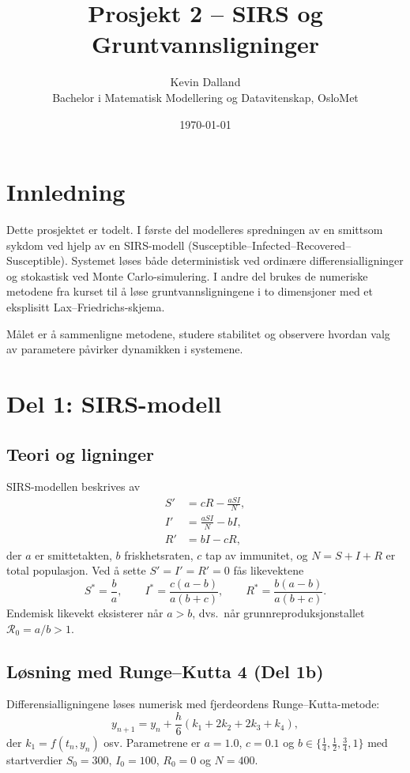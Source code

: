 \documentclass[a4paper,11pt]{article}
\title{Prosjekt 2 -- SIRS og Gruntvannsligninger}
\author{Kevin Dalland \\ Bachelor i Matematisk Modellering og Datavitenskap, OsloMet}
\date{\today}
\begin{document}
\maketitle
\tableofcontents
\newpage

\section{Innledning}
Dette prosjektet er todelt. I første del modelleres spredningen av en smittsom sykdom ved hjelp av en SIRS-modell (Susceptible–Infected–Recovered–Susceptible). Systemet løses både deterministisk ved ordinære differensialligninger og stokastisk ved Monte Carlo-simulering. I andre del brukes de numeriske metodene fra kurset til å løse gruntvannsligningene i to dimensjoner med et eksplisitt Lax--Friedrichs-skjema.

Målet er å sammenligne metodene, studere stabilitet og observere hvordan valg av parametere påvirker dynamikken i systemene.

\section{Del 1: SIRS-modell}
\subsection{Teori og ligninger}
SIRS-modellen beskrives av
\[
\begin{aligned}
S' &= cR - \frac{aSI}{N},\\
I' &= \frac{aSI}{N} - bI,\\
R' &= bI - cR,
\end{aligned}
\]
der $a$ er smittetakten, $b$ friskhetsraten, $c$ tap av immunitet, og $N=S+I+R$ er total populasjon. Ved å sette $S' = I' = R' = 0$ fås likevektene
\[
S^*=\frac{b}{a}, \qquad
I^*=\frac{c(a-b)}{a(b+c)}, \qquad
R^*=\frac{b(a-b)}{a(b+c)}.
\]
Endemisk likevekt eksisterer når $a>b$, dvs.\ når grunnreproduksjonstallet $\mathcal R_0 = a/b > 1$.

\subsection{Løsning med Runge--Kutta 4 (Del 1b)}
Differensialligningene løses numerisk med fjerdeordens Runge--Kutta-metode:
\[
y_{n+1}=y_n+\frac{h}{6}(k_1+2k_2+2k_3+k_4),
\]
der $k_1=f(t_n,y_n)$ osv. Parametrene er $a=1.0$, $c=0.1$ og $b\in\{\tfrac14,\tfrac12,\tfrac34,1\}$ med startverdier $S_0=300$, $I_0=100$, $R_0=0$ og $N=400$.
\end{document}
